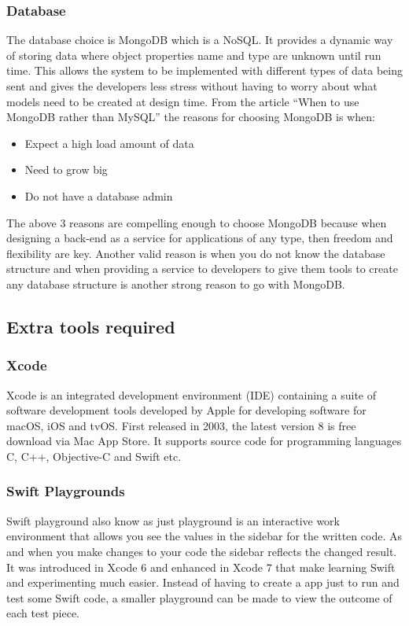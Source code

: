 \subsubsection{Database}
The database choice is MongoDB which is a NoSQL. It provides a dynamic way of storing data where object properties name and type are unknown until run time. This allows the system to be implemented with different types of data being sent and gives the developers less stress without having to worry about what models need to be created at design time. From the article “When to use MongoDB rather than MySQL” \cite{database} the reasons for choosing MongoDB is when:
\begin{itemize}
  \item Expect a high load amount of data
  \item Need to grow big 
  \item Do not have a database admin
\end{itemize}
The above 3 reasons are compelling enough to choose MongoDB because when designing a back-end as a service for applications of any type, then freedom and flexibility are key. Another valid reason is when you do not know the database structure and when providing a service to developers to give them tools to create any database structure is another strong reason to go with MongoDB. 

\subsection{Extra tools required}

\subsubsection{Xcode}

Xcode is an integrated development environment (IDE) containing a suite of software development tools developed by Apple for developing software for macOS, iOS and tvOS. First released in 2003, the latest version 8 is free download via Mac App Store. It supports source code for programming languages C, C++, Objective-C and Swift etc. 

\subsubsection{Swift Playgrounds}

Swift playground also know as just playground is an interactive work environment that allows you see the values in the sidebar for the written code. As and when you make changes to your code the sidebar reflects the changed result. It was introduced in Xcode 6 and enhanced in Xcode 7 that make learning Swift and experimenting much easier. Instead of having to create a app just to run and test some Swift code, a smaller playground can be made to view the outcome of each test piece. 

